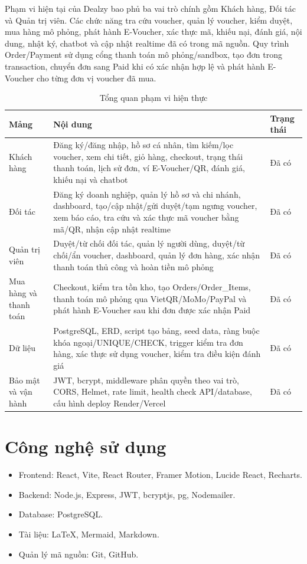 Phạm vi hiện tại của Dealzy bao phủ ba vai trò chính gồm Khách hàng, Đối tác và Quản trị viên. Các chức năng tra cứu voucher, quản lý voucher, kiểm duyệt, mua hàng mô phỏng, phát hành E-Voucher, xác thực mã, khiếu nại, đánh giá, nội dung, nhật ký, chatbot và cập nhật realtime đã có trong mã nguồn. Quy trình Order/Payment sử dụng cổng thanh toán mô phỏng/sandbox, tạo đơn trong transaction, chuyển đơn sang Paid khi có xác nhận hợp lệ và phát hành E-Voucher cho từng đơn vị voucher đã mua.

\begin{table}[H]
\centering
\small
\begin{tabularx}{\textwidth}{|p{3.0cm}|Y|p{3.2cm}|}
\hline
\textbf{Mảng} & \textbf{Nội dung} & \textbf{Trạng thái} \\ \hline
Khách hàng & Đăng ký/đăng nhập, hồ sơ cá nhân, tìm kiếm/lọc voucher, xem chi tiết, giỏ hàng, checkout, trạng thái thanh toán, lịch sử đơn, ví E-Voucher/QR, đánh giá, khiếu nại và chatbot & Đã có \\ \hline
Đối tác & Đăng ký doanh nghiệp, quản lý hồ sơ và chi nhánh, dashboard, tạo/cập nhật/gửi duyệt/tạm ngưng voucher, xem báo cáo, tra cứu và xác thực mã voucher bằng mã/QR, nhận cập nhật realtime & Đã có \\ \hline
Quản trị viên & Duyệt/từ chối đối tác, quản lý người dùng, duyệt/từ chối/ẩn voucher, dashboard, quản lý đơn hàng, xác nhận thanh toán thủ công và hoàn tiền mô phỏng & Đã có \\ \hline
Mua hàng và thanh toán & Checkout, kiểm tra tồn kho, tạo Orders/Order\_Items, thanh toán mô phỏng qua VietQR/MoMo/PayPal và phát hành E-Voucher sau khi đơn được xác nhận Paid & Đã có \\ \hline
Dữ liệu & PostgreSQL, ERD, script tạo bảng, seed data, ràng buộc khóa ngoại/UNIQUE/CHECK, trigger kiểm tra đơn hàng, xác thực sử dụng voucher, kiểm tra điều kiện đánh giá & Đã có \\ \hline
Bảo mật và vận hành & JWT, bcrypt, middleware phân quyền theo vai trò, CORS, Helmet, rate limit, health check API/database, cấu hình deploy Render/Vercel & Đã có\\ \hline
\end{tabularx}
\caption{Tổng quan phạm vi hiện thực}
\end{table}
\section{Công nghệ sử dụng}

\begin{itemize}[leftmargin=1.2cm]
    \item Frontend: React, Vite, React Router, Framer Motion, Lucide React, Recharts.
    \item Backend: Node.js, Express, JWT, bcryptjs, pg, Nodemailer.
    \item Database: PostgreSQL.
    \item Tài liệu: LaTeX, Mermaid, Markdown.
    \item Quản lý mã nguồn: Git, GitHub.
\end{itemize}
